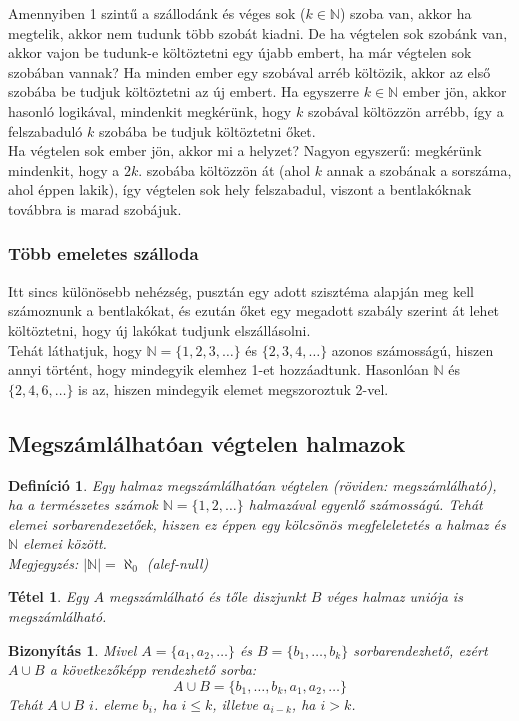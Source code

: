 \documentclass[a4paper,12pt,twoside]{book}
\newcommand{\N}{\mathbb{N}}
\newtheorem{defi}{Definíció}[chapter]
\newtheorem{tetel}{Tétel}[chapter]
\newtheorem{biz}{Bizonyítás}[chapter]
\theoremstyle{break}
\begin{document}
Amennyiben 1 szintű a szállodánk és véges sok ($k\in\N$) szoba van, akkor ha megtelik, akkor nem tudunk több szobát kiadni. De ha végtelen sok szobánk van, akkor vajon be tudunk-e költöztetni egy újabb embert, ha már végtelen sok szobában vannak? Ha minden ember egy szobával arréb költözik, akkor az első szobába be tudjuk költöztetni az új embert. Ha egyszerre $k\in\N$ ember jön, akkor hasonló logikával, mindenkit megkérünk, hogy $k$ szobával költözzön arrébb, így a felszabaduló $k$ szobába be tudjuk költöztetni őket.\\

Ha végtelen sok ember jön, akkor mi a helyzet? Nagyon egyszerű: megkérünk mindenkit, hogy a $2k.$ szobába költözzön át (ahol $k$ annak a szobának a sorszáma, ahol éppen lakik), így végtelen sok hely felszabadul, viszont a bentlakóknak továbbra is marad szobájuk.

\subsubsection{Több emeletes szálloda}

Itt sincs különösebb nehézség, pusztán egy adott szisztéma alapján meg kell számoznunk a bentlakókat, és ezután őket egy megadott szabály szerint át lehet költöztetni, hogy új lakókat tudjunk elszállásolni.\\

Tehát láthatjuk, hogy $\N = \{1,2,3,\ldots\}$ és $\{2, 3, 4, \ldots\}$ azonos számosságú, hiszen annyi történt, hogy mindegyik elemhez 1-et hozzáadtunk. Hasonlóan $\N$ és $\{2,4,6,\ldots\}$ is az, hiszen mindegyik elemet megszoroztuk 2-vel.

\subsection{Megszámlálhatóan végtelen halmazok}

\begin{defi}
 Egy halmaz \textit{megszámlálhatóan végtelen} (röviden: megszámlálható), ha a termé\-szetes számok $\N = \{1,2,\ldots\}$ halmazával egyenlő számosságú. Tehát elemei sorbarendezetőek, hiszen ez éppen egy kölcsönös megfeleletetés a halmaz és $\mathbb{N}$ elemei között.\\
 \emph{Megjegyzés}: $|\N| = \aleph_0$ (alef-null)
\end{defi}

\begin{tetel}
 Egy $A$ megszámlálható és tőle diszjunkt $B$ véges halmaz uniója is megszámlálható.
\end{tetel}
\begin{biz}
 Mivel $A = \{a_1, a_2, \ldots\}$ és $B = \{b_1, \ldots, b_k\}$ sorbarendezhető, ezért $A\cup B$ a következőképp rendezhető sorba:
 \[A\cup B = \{b_1, \ldots, b_k, a_1, a_2, \ldots\}\]
 Tehát $A\cup B$ $i$. eleme $b_i$, ha $i\leqslant k$, illetve $a_{i-k}$, ha $i> k$.
\end{biz}
\end{document}
